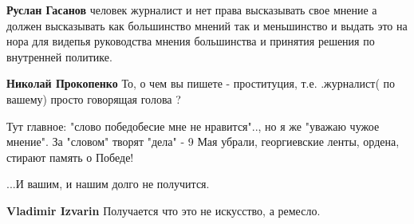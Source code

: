 \begin{itemize}
\begin{itemize}
 
\textbf{Руслан Гасанов} человек журналист и нет права высказывать свое мнение а должен высказывать как большинство мнений так и меньшинство и выдать это на нора для видепья руководства мнения большинства и принятия решения по внутренней политике.

 
\textbf{Николай Прокопенко} То, о чем вы пишете - проституция, т.е. .журналист( по вашему) просто говорящая голова ?

 

Тут главное: "слово победобесие мне не нравится".., но я же "уважаю чужое
мнение". За "словом" творят "дела" - 9 Мая убрали, георгиевские ленты, ордена,
стирают память о Победе!

...И вашим, и нашим долго не получится.


 
\textbf{Vladimir Izvarin} Получается что это не искусство, а ремесло.

\end{itemize}

\end{itemize}

